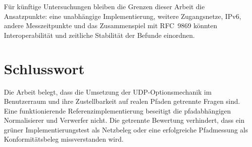 Für künftige Untersuchungen bleiben die Grenzen dieser Arbeit die Ansatzpunkte: eine unabhängige
Implementierung, weitere Zugangsnetze, IPv6, andere Messzeitpunkte und das Zusammenspiel mit RFC~9869
\cite{rfc9869} könnten Interoperabilität und zeitliche Stabilität der Befunde einordnen.

\section{Schlusswort}
\label{sec:schlusswort}

Die Arbeit belegt, dass die Umsetzung der UDP-Optionsmechanik im Benutzerraum und ihre Zustellbarkeit
auf realen Pfaden getrennte Fragen sind. Eine funktionierende Referenzimplementierung beseitigt die
pfadabhängigen Normalisierer und Verwerfer nicht. Die getrennte Bewertung verhindert, dass ein grüner
Implementierungstest als Netzbeleg oder eine erfolgreiche Pfadmessung als Konformitätsbeleg
missverstanden wird.
